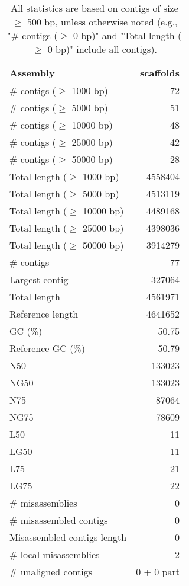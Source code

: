 \documentclass[12pt,a4paper]{article}
\begin{document}
\begin{table}[ht]
\begin{center}
\caption{All statistics are based on contigs of size $\geq$ 500 bp, unless otherwise noted (e.g., "\# contigs ($\geq$ 0 bp)" and "Total length ($\geq$ 0 bp)" include all contigs).}
\begin{tabular}{|l*{1}{|r}|}
\hline
Assembly & scaffolds \\ \hline
\# contigs ($\geq$ 1000 bp) & 72 \\ \hline
\# contigs ($\geq$ 5000 bp) & 51 \\ \hline
\# contigs ($\geq$ 10000 bp) & 48 \\ \hline
\# contigs ($\geq$ 25000 bp) & 42 \\ \hline
\# contigs ($\geq$ 50000 bp) & 28 \\ \hline
Total length ($\geq$ 1000 bp) & 4558404 \\ \hline
Total length ($\geq$ 5000 bp) & 4513119 \\ \hline
Total length ($\geq$ 10000 bp) & 4489168 \\ \hline
Total length ($\geq$ 25000 bp) & 4398036 \\ \hline
Total length ($\geq$ 50000 bp) & 3914279 \\ \hline
\# contigs & 77 \\ \hline
Largest contig & 327064 \\ \hline
Total length & 4561971 \\ \hline
Reference length & 4641652 \\ \hline
GC (\%) & 50.75 \\ \hline
Reference GC (\%) & 50.79 \\ \hline
N50 & 133023 \\ \hline
NG50 & 133023 \\ \hline
N75 & 87064 \\ \hline
NG75 & 78609 \\ \hline
L50 & 11 \\ \hline
LG50 & 11 \\ \hline
L75 & 21 \\ \hline
LG75 & 22 \\ \hline
\# misassemblies & 0 \\ \hline
\# misassembled contigs & 0 \\ \hline
Misassembled contigs length & 0 \\ \hline
\# local misassemblies & 2 \\ \hline
\# unaligned contigs & 0 + 0 part \\ \hline

\end{tabular}
\end{center}
\end{table}
\end{document}
